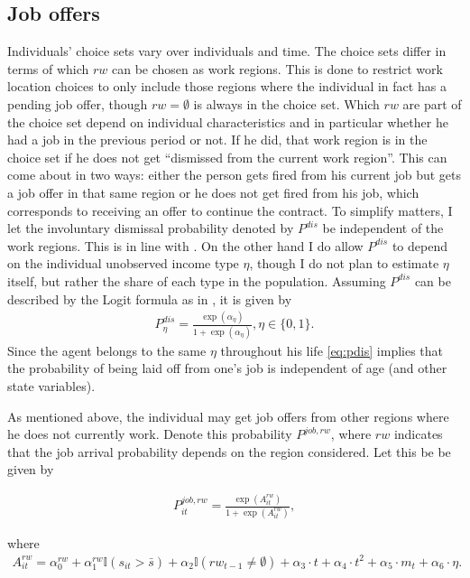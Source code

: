 \subsection{Job offers}
Individuals' choice sets vary over individuals and time. The choice sets differ in terms of which $rw$ can be chosen as work regions. This is done to restrict work location choices to only include those regions where the individual in fact has a pending job offer, though $rw=\emptyset$ is always in the choice set. Which $rw$ are part of the choice set depend on individual characteristics and in particular whether he had a job in the previous period or not. If he did, that work region is in the choice set if he does not get ``dismissed from the current work region''. This can come about in two ways: either the person gets fired from his current job but gets a job offer in that same region or he does not get fired from his job, which corresponds to receiving an offer to continue the contract.  To simplify matters, I let the involuntary dismissal probability denoted by $P^{dis}$ be independent of the work regions. This is in line with \citet{Buchinsky2014}. On the other hand I do allow $P^{dis}$ to depend on the individual unobserved income type $\eta$, though I do not plan to estimate $\eta$ itself, but rather the share of each type in the population. Assuming $P^{dis}$ can be described by the Logit formula as in \citet{Buchinsky2014}, it is given by
\begin{align}
P^{dis}_{\eta} = \frac{\exp{(\alpha_{\eta})}}{1+\exp{(\alpha_{\eta})}}, \eta\in\{0,1\}.
\label{eq:pdis}
\end{align}  
Since the agent belongs to the same $\eta$ throughout his life \eqref{eq:pdis} implies that the probability of being laid off from one's job is independent of age (and other state variables).

As mentioned above, the individual may get job offers from other regions where he does not currently work. Denote this probability $P^{job,rw}$, where $rw$ indicates that the job arrival probability depends on the region considered. Let this be be given by 

\begin{align}
P^{job,rw}_{it}=\frac{\exp{(A^{rw}_{it})}}{1+\exp{(A^{rw}_{it})}},
\label{eq:pjob}
\end{align}

where
\begin{align*}
A^{rw}_{it}=\alpha_0^{rw}+\alpha_1^{rw}\mathbb{I}{(s_{it}>\bar{s})}+\alpha_2 \mathbb{I}{(rw_{t-1}\neq \emptyset)}+\alpha_3\cdot t + \alpha_4 \cdot t^2 + \alpha_5 \cdot m_t+\alpha_6 \cdot  \eta.
\end{align*}

